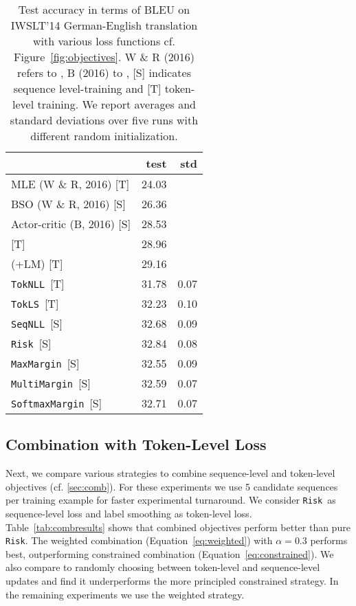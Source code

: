 \documentclass[11pt,a4paper]{article}
\newcommand{\TokNLL}{\texttt{TokNLL}}
\newcommand{\TokLS}{\texttt{TokLS}}
\newcommand{\SeqNLL}{\texttt{SeqNLL}}
\newcommand{\Risk}{\texttt{Risk}}
\newcommand{\MaxMargin}{\texttt{MaxMargin}}
\newcommand{\MultiMargin}{\texttt{MultiMargin}}
\newcommand{\SoftmaxMargin}{\texttt{SoftmaxMargin}}
\begin{document}
\begin{table}[t]
\centering
\begin{tabular}{lrr}
\toprule
& \bf test & \bf std \\ \midrule
MLE (W \& R, 2016) [T] & 24.03 \\
BSO (W \& R, 2016) [S] & 26.36 \\ 
Actor-critic (B, 2016) [S] & 28.53 \\
\citet{huang2017npbmt} [T] & 28.96 \\
\citet{huang2017npbmt} (+LM) [T] & 29.16 \\ 
\midrule
\TokNLL~[T] & 31.78 & 0.07 \\
\TokLS~[T] & 32.23 & 0.10 \\ \midrule
\SeqNLL~[S] & 32.68 & 0.09 \\
\Risk~[S] & 32.84 & 0.08 \\
\MaxMargin~[S] & 32.55 & 0.09  \\
\MultiMargin~[S] & 32.59 & 0.07 \\
\SoftmaxMargin~[S] & 32.71 & 0.07 \\
\bottomrule
\end{tabular}
\caption{Test accuracy in terms of BLEU on IWSLT'14 German-English translation with various loss functions cf. Figure~\ref{fig:objectives}.
W \& R (2016) refers to \citet{wiseman2016acl}, B (2016) to \citet{bahdanau2016ac},
[S] indicates sequence level-training and [T] token-level training. We report averages and standard deviations over five runs with different random initialization. 
}
\label{tab:seqresults}
\end{table}



\subsection{Combination with Token-Level Loss}
\label{sec:results_comb}

Next, we compare various strategies to combine sequence-level and token-level objectives (cf. \textsection\ref{sec:comb}).
For these experiments we use 5 candidate sequences per training example for faster experimental turnaround.
We consider \Risk~as sequence-level loss and label smoothing as token-level loss.
Table~\ref{tab:combresults} shows that combined objectives perform better than pure \Risk.
The weighted combination (Equation~\ref{eq:weighted}) with $\alpha=0.3$ performs best, outperforming constrained combination (Equation~\ref{eq:constrained}).
We also compare to randomly choosing between token-level and sequence-level updates and find it underperforms the more principled constrained strategy.
In the remaining experiments we use the weighted strategy.
\end{document}
